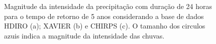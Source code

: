 \documentclass[
]{agujournal2019}
\begin{document}
\begin{figure}
\begin{minipage}{\linewidth}
{}


\end{minipage}%
\newline
\begin{minipage}{\linewidth}



\end{minipage}%

\caption{\label{fig-Figura4}Magnitude da intensidade da precipitação com
duração de 24 horas para o tempo de retorno de 5 anos considerando a
base de dados HDIRO (a); XAVIER (b) e CHIRPS (c). O tamanho dos circulos
azuis indica a magnitude da intensidade das chuvas.}

\end{figure}%
\end{document}
